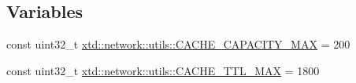 \subsection*{Variables}
\begin{DoxyCompactItemize}
\item 
const uint32\+\_\+t \hyperlink{namespacextd_1_1network_1_1utils_a8939e806c4a6bc08b78a32941db7a130}{xtd\+::network\+::utils\+::\+C\+A\+C\+H\+E\+\_\+\+C\+A\+P\+A\+C\+I\+T\+Y\+\_\+\+M\+AX} = 200
\item 
const uint32\+\_\+t \hyperlink{namespacextd_1_1network_1_1utils_adb4767541db3a79016a24142db705161}{xtd\+::network\+::utils\+::\+C\+A\+C\+H\+E\+\_\+\+T\+T\+L\+\_\+\+M\+AX} = 1800
\end{DoxyCompactItemize}
